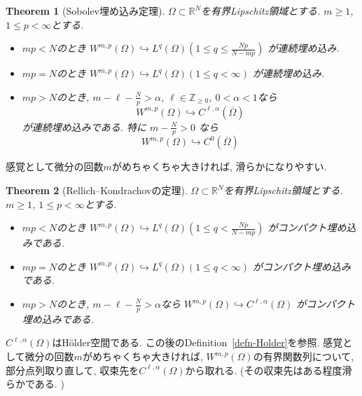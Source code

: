 \documentclass[dvipdfmx,a4paper,11pt]{article} %
\newtheorem{thm}{Theorem}[section]
\theoremstyle{definition}
\theoremstyle{remark}
\numberwithin{equation}{section}
\begin{document}
\begin{thm}[Sobolev埋め込み定理]
\label{thm-Sobolev}
\(\Omega\subset\mathbb{R}^N\)を有界Lipschitz領域とする. \(m\geq 1\), \(1\leq p<\infty\)とする.

\begin{itemize}
\item  \(mp<N\)のとき
\(
W^{m,p}(\Omega)\hookrightarrow L^q(\Omega) \)\(\left(1\leq q\leq \frac{Np}{N-mp}\right)
\)
が連続埋め込み.
\item \(mp=N\)のとき
\(
W^{m,p}(\Omega)\hookrightarrow L^q(\Omega)\)\( (1\leq q<\infty)
\)
が連続埋め込み.
\item  \(mp>N\)のとき, \(m-\ell-\frac{N}{p}>\alpha\), \(\ell\in\mathbb{Z}_{\geq0}\), \(0<\alpha<1\)なら
\[
W^{m,p}(\Omega)\hookrightarrow C^{\ell,\alpha}(\overline{\Omega})
\]
が連続埋め込みである. 
特に
\(
m-\frac{N}{p}>0
\)
なら
\[
W^{m,p}(\Omega)\hookrightarrow C^0(\overline{\Omega})
\]
\end{itemize}

\end{thm}
感覚として微分の回数$m$がめちゃくちゃ大きければ, 滑らかになりやすい. 

\begin{thm}[Rellich--Kondrachovの定理]
\label{thm-Rellich}
\(\Omega\subset\mathbb{R}^N\)を有界Lipschitz領域とする. \(m\geq 1\), \(1\leq p<\infty\)とする. 

\begin{itemize}
\item \(mp<N\)のとき
\(
W^{m,p}(\Omega)\hookrightarrow L^q(\Omega)\)\( \left(1\leq q<\frac{Np}{N-mp}\right)
\)
がコンパクト埋め込みである.
\item  \(mp=N\)のとき
\(
W^{m,p}(\Omega)\hookrightarrow L^q(\Omega)\)\( (1\leq q<\infty)
\)
がコンパクト埋め込みである. 
\item \(mp>N\)のとき, \(m-\ell-\frac{N}{p}>\alpha\)なら
\(
W^{m,p}(\Omega)\hookrightarrow C^{\ell,\alpha}(\Omega)
\)
がコンパクト埋め込みである.
\end{itemize}
\end{thm}
$C^{\ell,\alpha}(\Omega)$はH\"older空間である. この後のDefinition~\ref{defn-Holder}を参照. 
感覚として微分の回数$m$がめちゃくちゃ大きければ, $W^{m,p}(\Omega)$の有界関数列について, 部分点列取り直して, 収束先を$C^{\ell,\alpha}(\Omega)$から取れる. (その収束先はある程度滑らかである. )
\end{document}
